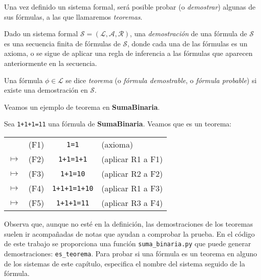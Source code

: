 Una vez definido un sistema formal, será posible probar (o \emph{demostrar}) algunas de sus fórmulas, a las que llamaremos \emph{teoremas}.

\begin{definicion}\label{def:teorema-demostracion}
Dado un sistema formal $\mathcal{S}=(\mathcal{L}, \mathcal{A}, \mathcal{R})$, una \emph{demostración} de una fórmula de $\mathcal{S}$ es una secuencia finita de fórmulas de $\mathcal{S}$, donde cada una de las fórmulas es un axioma, o se sigue de aplicar una regla de inferencia a las fórmulas que aparecen anteriormente en la secuencia.

Una fórmula $\phi\in \mathcal{L}$ se dice \emph{teorema} (o \emph{fórmula demostrable}, o \emph{fórmula probable}) si existe una demostración en $\mathcal{S}$.
\end{definicion}

Veamos un ejemplo de teorema en \textbf{SumaBinaria}.

\begin{ejemplo}\label{ej:teorema}
Sea \texttt{1+1+1=11} una fórmula de \textbf{SumaBinaria}. Veamos que es un teorema:

\begin{table}[h]
\centering
\begin{tabular}{lrcl}
& (F1) & \texttt{1=1} & (axioma) \\
$\mapsto$ & (F2) & \texttt{1+1=1+1} & (aplicar R1 a F1) \\
$\mapsto$ & (F3) & \texttt{1+1=10} & (aplicar R2 a F2) \\
$\mapsto$ & (F4) & \texttt{1+1+1=1+10} & (aplicar R1 a F3) \\
$\mapsto$ & (F5) & \texttt{1+1+1=11} & (aplicar R3 a F4) \\
\end{tabular}
\end{table}
\end{ejemplo}

Observa que, aunque no esté en la definición, las demostraciones de los teoremas suelen ir acompañadas de notas que ayudan a comprobar la prueba. En el código de este trabajo se proporciona una función \texttt{suma\_binaria.py} que puede generar demostraciones: \texttt{es\_teorema}. Para probar si una fórmula es un teorema en alguno de los sistemas de este capítulo, especifica el nombre del sistema seguido de la fórmula.

